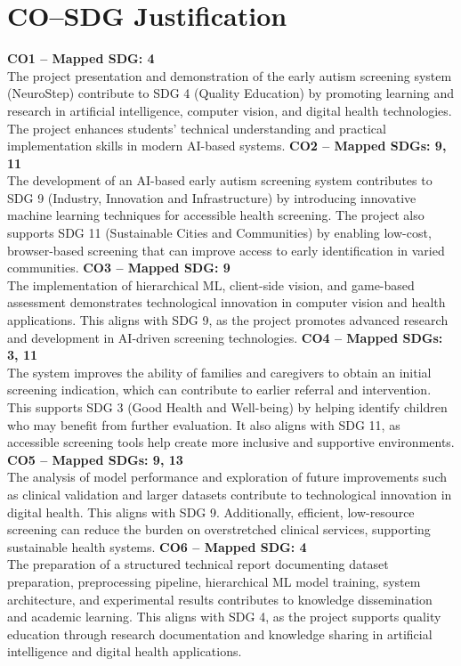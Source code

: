 \documentclass[12pt,a4paper]{report}
\begin{document}
\section{CO–SDG Justification}
\textbf{CO1 – Mapped SDG: 4} \\
The project presentation and demonstration of the early autism screening system (NeuroStep) contribute to SDG 4 (Quality Education) by promoting learning and research in artificial intelligence, computer vision, and digital health technologies. The project enhances students' technical understanding and practical implementation skills in modern AI-based systems.
\textbf{CO2 – Mapped SDGs: 9, 11} \\
The development of an AI-based early autism screening system contributes to SDG 9 (Industry, Innovation and Infrastructure) by introducing innovative machine learning techniques for accessible health screening. The project also supports SDG 11 (Sustainable Cities and Communities) by enabling low-cost, browser-based screening that can improve access to early identification in varied communities.
\textbf{CO3 – Mapped SDG: 9} \\
The implementation of hierarchical ML, client-side vision, and game-based assessment demonstrates technological innovation in computer vision and health applications. This aligns with SDG 9, as the project promotes advanced research and development in AI-driven screening technologies.
\textbf{CO4 – Mapped SDGs: 3, 11} \\
The system improves the ability of families and caregivers to obtain an initial screening indication, which can contribute to earlier referral and intervention. This supports SDG 3 (Good Health and Well-being) by helping identify children who may benefit from further evaluation. It also aligns with SDG 11, as accessible screening tools help create more inclusive and supportive environments.
\textbf{CO5 – Mapped SDGs: 9, 13} \\
The analysis of model performance and exploration of future improvements such as clinical validation and larger datasets contribute to technological innovation in digital health. This aligns with SDG 9. Additionally, efficient, low-resource screening can reduce the burden on overstretched clinical services, supporting sustainable health systems.
\textbf{CO6 – Mapped SDG: 4} \\
The preparation of a structured technical report documenting dataset preparation, preprocessing pipeline, hierarchical ML model training, system architecture, and experimental results contributes to knowledge dissemination and academic learning. This aligns with SDG 4, as the project supports quality education through research documentation and knowledge sharing in artificial intelligence and digital health applications.
\end{document}
